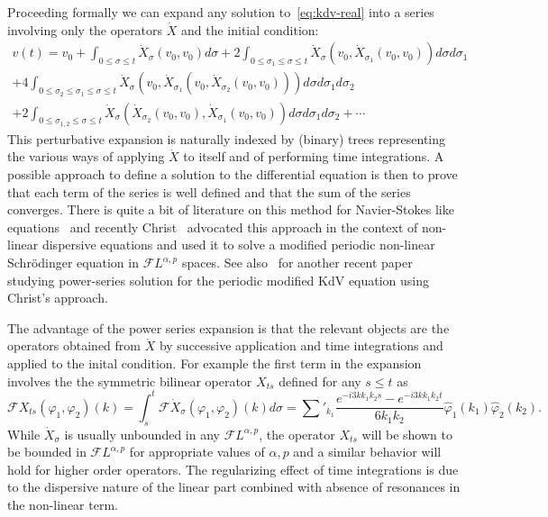 \documentclass[a4paper,11pt,reqno]{article}
\newcommand{\FF}{\mathcal{F}}
\newcommand{\wh}{\widehat}
\begin{document}
Proceeding formally we can expand any solution to~\eqref{eq:kdv-real} into a series involving only the operators $\dot X$ and the initial condition:
\begin{equation}
\label{eq:power-series}
\begin{split}
v(t) = v_0 + \int_{0\le \sigma\le t} \dot X_{\sigma}(v_0,v_0) d\sigma+ 2 \int_{0\le \sigma_1\le\sigma\le t}  \dot X_{\sigma}(v_0,\dot X_{\sigma_1}(v_0,v_0)) d\sigma d\sigma_1
\\
+  4 \int_{0\le \sigma_2 \le \sigma_1\le\sigma\le t}  \dot X_{\sigma}(v_0,\dot X_{\sigma_1}(v_0,\dot X_{\sigma_2}(v_0,v_0))) d\sigma d\sigma_1 d\sigma_2
\\
+  2 \int_{0\le \sigma_{1,2} \le \sigma\le t}   \dot X_{\sigma}(\dot X_{\sigma_2}(v_0,v_0),\dot X_{\sigma_1}(v_0,v_0)) d\sigma d\sigma_1 d\sigma_2
+ \cdots 
\end{split}
\end{equation}
This perturbative expansion is naturally indexed by (binary) trees representing the various ways of applying $\dot X$ to itself and of performing time integrations. A possible approach to define a solution to the differential equation is then to prove that each term of the series is well defined and that the sum of the series converges. There is quite a bit of literature on this method for Navier-Stokes like equations~\cite{Gall,LS,Sinai3,Sinai2,MR2227041} and recently Christ~\cite{MR2333210} advocated this approach in the context of non-linear dispersive equations and used it to solve a modified periodic non-linear Schr\"odinger equation in  $\FF L^{\alpha,p}$ spaces. See also~\cite{MR2411067} for another recent paper studying power-series solution for the periodic modified KdV equation using Christ's approach.
 
The advantage of the power series expansion 
is that the relevant objects are the operators obtained from $\dot X$ by successive application and time integrations and applied to the inital condition. For example the first term in the expansion involves the the symmetric bilinear operator
$X_{ts}$ defined  for any $s\le t$ as
$$
\FF X_{ts}(\varphi_1,\varphi_2)(k) = \int_s^t \FF \dot X_\sigma(\varphi_1,\varphi_2)(k) d\sigma = 
\sum'_{k_1} \frac{e^{-i 3 k k_1 k_2
      s}-e^{-i 3 k k_1 k_2 t}}{6 k_1 k_2}\wh\varphi_1(k_1)
\wh \varphi_2(k_2) .
$$
While $\dot X_\sigma$ is usually unbounded in any $\FF L^{\alpha,p}$, the operator $X_{ts}$ will be shown to be bounded in $\FF L^{\alpha,p}$ for appropriate values of $\alpha,p$ and a similar  behavior will hold for higher order operators. The regularizing effect of time integrations is due to the dispersive nature of the linear part combined with absence of resonances in the non-linear term.
  
\end{document}
